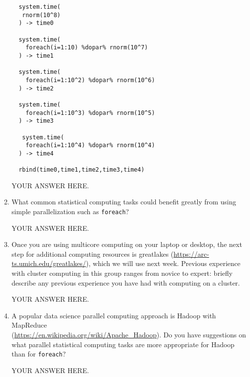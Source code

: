 \documentclass[12pt]{article}
\begin{document}
\begin{enumerate}
\begin{verbatim}
  system.time(
   rnorm(10^8)
  ) -> time0

  system.time(
    foreach(i=1:10) %dopar% rnorm(10^7)
  ) -> time1

  system.time(
    foreach(i=1:10^2) %dopar% rnorm(10^6)
  ) -> time2

  system.time(
    foreach(i=1:10^3) %dopar% rnorm(10^5)
  ) -> time3

   system.time(
    foreach(i=1:10^4) %dopar% rnorm(10^4)
  ) -> time4
  
  rbind(time0,time1,time2,time3,time4)
\end{verbatim}

  YOUR ANSWER HERE.

\item What common statistical computing tasks could benefit greatly from using simple parallelization such as \texttt{foreach}?
  
YOUR ANSWER HERE.

\item Once you are using multicore computing on your laptop or desktop, the next step for additional computing resources is greatlakes (\url{https://arc-ts.umich.edu/greatlakes/}), which we will use next week. Previous experience with cluster computing in this group ranges from novice to expert: briefly describe any previous experience you have had with computing on a cluster.

  YOUR ANSWER HERE.

\item A popular data science parallel computing approach is Hadoop with MapReduce\\
(\url{https://en.wikipedia.org/wiki/Apache_Hadoop}). Do you have suggestions on what parallel statistical computing tasks are more appropriate for Hadoop than for \texttt{foreach}?

  YOUR ANSWER HERE.
  
\end{enumerate}
\end{document}
